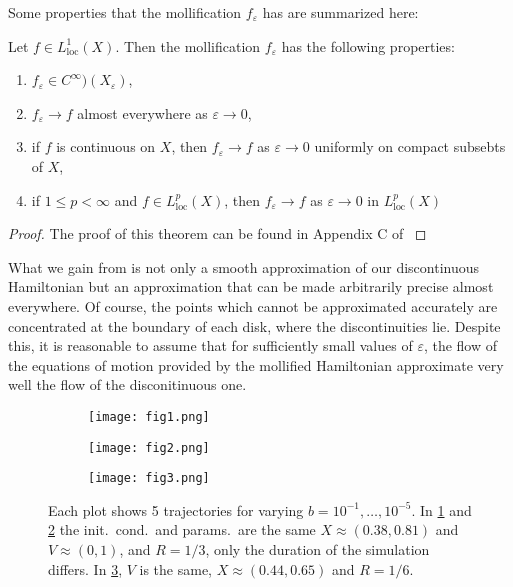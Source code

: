 Some properties that the mollification $f_\varepsilon$ has are summarized here:
\begin{theorem}\label{thm:mollification}
Let $f\in L_{\text{loc}}^1(X)$. Then the mollification $f_\varepsilon$ has the following properties:
\begin{enumerate}
\item $f_\varepsilon\in C^\infty)(X_\varepsilon)$,
\item $f_\varepsilon\to f$ almost everywhere as $\varepsilon\to0$,
\item if $f$ is continuous on $X$, then $f_\varepsilon\to f$ as $\varepsilon\to0$ uniformly on compact subsebts of $X$,
\item if $1\le p <\infty$ and $f\in L_{\text{loc}}^p(X)$, then $f_\varepsilon\to f$ as $\varepsilon\to 0$ in $L_{\text{loc}}^p(X)$
\end{enumerate}
\end{theorem}
\begin{proof}
The proof of this theorem can be found in Appendix C of \cite{Evans_1998}
\end{proof}

What we gain from  is not only a smooth approximation of our discontinuous Hamiltonian but an approximation that can be made arbitrarily precise almost everywhere. Of course, the points which cannot be approximated accurately are concentrated at the boundary of each disk, where the discontinuities lie. Despite this, it is reasonable to assume that for sufficiently small values of $\varepsilon$, the flow of the equations of motion provided by the mollified Hamiltonian approximate very well the flow of the disconitinuous one.

\begin{figure}[!th]
\centering
\hfill
\begin{subfigure}[t]{0.30\textwidth}
\centering
\texttt{[image: fig1.png]}
\caption{}
\label{subfig:weakcomparisonA}
\end{subfigure}
\hfill
\begin{subfigure}[t]{0.30\textwidth}
\centering
\texttt{[image: fig2.png]}
\caption{}
\label{subfig:weakcomparisonB}
\end{subfigure}
\hfill
\begin{subfigure}[t]{0.30\textwidth}
\centering
\texttt{[image: fig3.png]}
\caption{}
\label{subfig:weakcomparisonC}
\end{subfigure}
\hfill
\caption{Each plot shows 5 trajectories for varying $b=10^{-1},\dots,10^{-5}$. In \cref{subfig:weakcomparisonA} and \cref{subfig:weakcomparisonB} the init.~cond.~and params.~are the same $X\approx(0.38,0.81)$ and $V\approx(0,1)$, and $R=1/3$, only the duration of the simulation differs. In \cref{subfig:weakcomparisonC}, $V$ is the same, $X \approx(0.44,0.65)$ and $R=1/6$.}
\label{fig:weakcomparison}
\end{figure}


